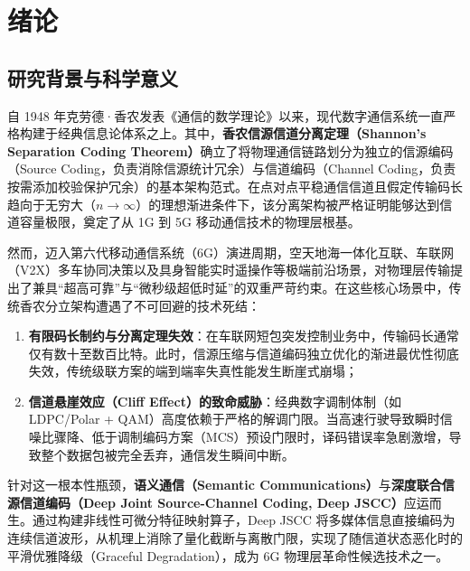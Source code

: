 \chapter{绪论}
\label{chap:intro}

\section{研究背景与科学意义}
自 1948 年克劳德·香农发表《通信的数学理论》以来，现代数字通信系统一直严格构建于经典信息论体系之上。其中，\textbf{香农信源信道分离定理（Shannon's Separation Coding Theorem）}确立了将物理通信链路划分为独立的信源编码（Source Coding，负责消除信源统计冗余）与信道编码（Channel Coding，负责按需添加校验保护冗余）的基本架构范式。在点对点平稳通信信道且假定传输码长趋向于无穷大（$n \to \infty$）的理想渐进条件下，该分离架构被严格证明能够达到信道容量极限，奠定了从 1G 到 5G 移动通信技术的物理层根基。

然而，迈入第六代移动通信系统（6G）演进周期，空天地海一体化互联、车联网（V2X）多车协同决策以及具身智能实时遥操作等极端前沿场景，对物理层传输提出了兼具“超高可靠”与“微秒级超低时延”的双重严苛约束。在这些核心场景中，传统香农分立架构遭遇了不可回避的技术死结：
\begin{enumerate}
  \item \textbf{有限码长制约与分离定理失效}：在车联网短包突发控制业务中，传输码长通常仅有数十至数百比特。此时，信源压缩与信道编码独立优化的渐进最优性彻底失效，传统级联方案的端到端率失真性能发生断崖式崩塌；
  \item \textbf{信道悬崖效应（Cliff Effect）的致命威胁}：经典数字调制体制（如 LDPC/Polar + QAM）高度依赖于严格的解调门限。当高速行驶导致瞬时信噪比骤降、低于调制编码方案（MCS）预设门限时，译码错误率急剧激增，导致整个数据包被完全丢弃，通信发生瞬间中断。
\end{enumerate}

针对这一根本性瓶颈，\textbf{语义通信（Semantic Communications）}与\textbf{深度联合信源信道编码（Deep Joint Source-Channel Coding, Deep JSCC）}应运而生。通过构建非线性可微分特征映射算子，Deep JSCC 将多媒体信息直接编码为连续信道波形，从机理上消除了量化截断与离散门限，实现了随信道状态恶化时的平滑优雅降级（Graceful Degradation），成为 6G 物理层革命性候选技术之一。

